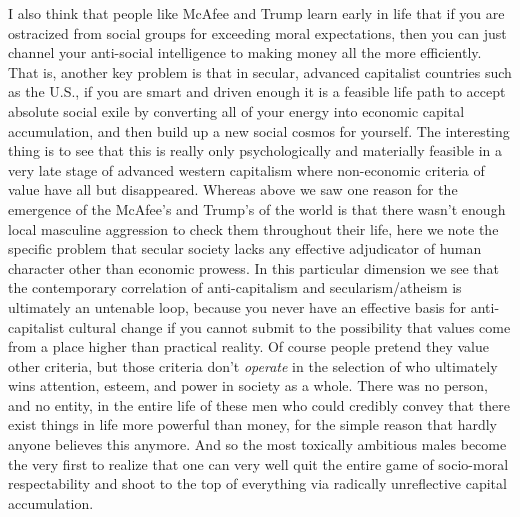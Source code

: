 \documentclass[a4paper,12pt,margin=.5in]{article}
\begin{document}
I also think that people like McAfee and Trump learn early in life that
if you are ostracized from social groups for exceeding moral
expectations, then you can just channel your anti-social intelligence to
making money all the more efficiently. That is, another key problem is
that in secular, advanced capitalist countries such as the U.S., if you
are smart and driven enough it is a feasible life path to accept
absolute social exile by converting all of your energy into economic
capital accumulation, and then build up a new social cosmos for
yourself. The interesting thing is to see that this is really only
psychologically and materially feasible in a very late stage of advanced
western capitalism where non-economic criteria of value have all but
disappeared. Whereas above we saw one reason for the emergence of the
McAfee's and Trump's of the world is that there wasn't enough local
masculine aggression to check them throughout their life, here we note
the specific problem that secular society lacks any effective
adjudicator of human character other than economic prowess. In this
particular dimension we see that the contemporary correlation of
anti-capitalism and secularism/atheism is ultimately an untenable loop,
because you never have an effective basis for anti-capitalist cultural
change if you cannot submit to the possibility that values come from a
place higher than practical reality. Of course people pretend they value
other criteria, but those criteria don't \emph{operate} in the selection
of who ultimately wins attention, esteem, and power in society as a
whole. There was no person, and no entity, in the entire life of these
men who could credibly convey that there exist things in life more
powerful than money, for the simple reason that hardly anyone believes
this anymore. And so the most toxically ambitious males become the very
first to realize that one can very well quit the entire game of
socio-moral respectability and shoot to the top of everything via
radically unreflective capital accumulation.
\end{document}

